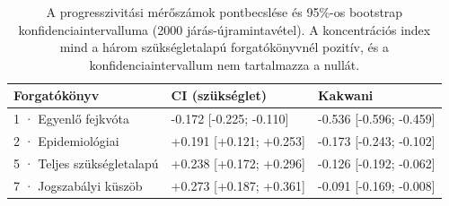 \begin{table}[htbp]
\centering
\small
\begin{tabular}{p{3.4cm}p{5.2cm}p{5.2cm}}
\toprule
Forgatókönyv & CI (szükséglet) & Kakwani \\
\midrule
1 · Egyenlő fejkvóta & -0.172 [-0.225; -0.110] & -0.536 [-0.596; -0.459] \\
2 · Epidemiológiai & +0.191 [+0.121; +0.253] & -0.173 [-0.243; -0.102] \\
5 · Teljes szükségletalapú & +0.238 [+0.172; +0.296] & -0.126 [-0.192; -0.062] \\
7 · Jogszabályi küszöb & +0.273 [+0.187; +0.361] & -0.091 [-0.169; -0.008] \\
\bottomrule
\end{tabular}
\caption{A progresszivitási mérőszámok pontbecslése és 95\%-os bootstrap konfidenciaintervalluma (2000 járás-újramintavétel). A koncentrációs index mind a három szükségletalapú forgatókönyvnél pozitív, és a konfidenciaintervallum nem tartalmazza a nullát.}
\label{tab:bootstrap}
\end{table}
